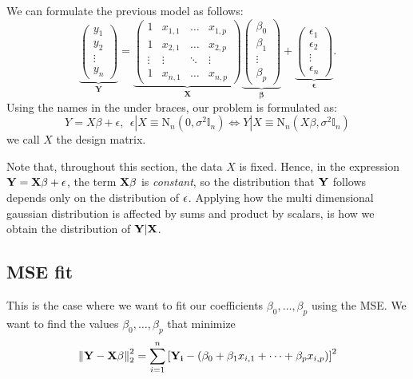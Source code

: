 We can formulate the previous model as follows:
\[
  \underbrace{\left( \begin{array}{c}y_1 \\ y_2 \\ \vdots \\ y_n \end{array} \right)}_{\mathbf Y} = \underbrace{\left( \begin{array}{cccc}1 & x_{1,1} & \ldots & x_{1,p} \\ 1 & x_{2,1} & \ldots & x_{2,p} \\\vdots & \vdots   & \ddots & \vdots \\  1 & x_{n,1} & \ldots &x_{n,p}\end{array} \right)}_{\mathbf{X}} \underbrace{\left( \begin{array}{c}\beta_0 \\ \beta_1 \\ \vdots \\ \beta_p\end{array} \right)}_{\mathbf \beta} +\underbrace{\left(\begin{array}{c}\epsilon_1 \\ \epsilon_2 \\ \vdots \\ \epsilon_n\end{array} \right)}_{\mathbf \epsilon}.  
\]
Using the names in the under braces, our problem is formulated as:
\[
  Y = X\beta + \epsilon, \ \ \epsilon|X\equiv \mbox{N}_n(0,\sigma^2 \mathbb{I}_n)\Leftrightarrow Y|X   \equiv \mbox{N}_n(X\beta,\sigma^2 \mathbb{I}_n)  
\]
we call \(X\) the design matrix. 

Note that, throughout this section, the data \(X\) is fixed. Hence, in the expression \(\mathbf{Y} = \mathbf{X}\mathbf{\beta} + \mathbf{\epsilon}\), the term \(\mathbf{X\beta}\) is \emph{constant}, so the distribution that \(\mathbf{Y}\) follows depends only on the distribution of \(\mathbf{\epsilon}\). Applying how the multi dimensional gaussian distribution is affected by sums and product by scalars, is how we obtain the distribution of \(\mathbf{Y}|\mathbf{X}\).

\subsection{MSE fit}

This is the case where we want to fit our coefficients \( \beta_0,\dots, \beta_p\) using the MSE. We want to find the values \(\beta_0,\dots, \beta_p\) that minimize
\[
\left\lVert\mathbf{Y} - \mathbf{X\beta}\right\rVert_2^2 = \sum_{i=1}^n \left[ \mathbf{Y_i} - (\beta_0 + \beta_1 x_{i,1} + \dots + \beta_p x_{i,p})\right]^2
\]

